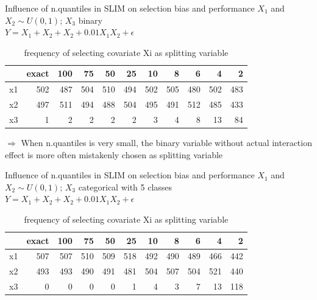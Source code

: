 \documentclass[9pt, xcolor=table]{beamer}
\begin{document}
\begin{frame}{Influence of n.quantiles in SLIM on selection bias and performance}
$X_1$ and $X_2 \sim U(0,1)$; $X_3$ binary\\
$Y = X_1 + X_2 + X_2 + 0.01X_1X_2 + \epsilon$

\begin{table}

\caption{frequency of selecting covariate Xi as splitting variable}
\centering
\begin{tabular}[t]{l|r|r|r|r|r|r|r|r|r|r}
\hline
  & exact & 100 & 75 & 50 & 25 & 10 & 8 & 6 & 4 & 2\\
\hline
x1 & 502 & 487 & 504 & 510 & 494 & 502 & 505 & 480 & 502 & 483\\
\hline
x2 & 497 & 511 & 494 & 488 & 504 & 495 & 491 & 512 & 485 & 433\\
\hline
x3 & 1 & 2 & 2 & 2 & 2 & 3 & 4 & 8 & 13 & 84\\
\hline
\end{tabular}
\end{table}

$\Rightarrow$ When n.quantiles is very small, the binary variable without actual interaction effect is more often mistakenly chosen as splitting variable

\end{frame}

\begin{frame}{Influence of n.quantiles in SLIM on selection bias and performance}
$X_1$ and $X_2 \sim U(0,1)$; $X_3$ categorical with 5 classes\\
$Y = X_1 + X_2 + X_2 + 0.01X_1X_2 + \epsilon$

\begin{table}

\caption{frequency of selecting covariate Xi as splitting variable}
\centering
\begin{tabular}[t]{l|r|r|r|r|r|r|r|r|r|r}
\hline
  & exact & 100 & 75 & 50 & 25 & 10 & 8 & 6 & 4 & 2\\
\hline
x1 & 507 & 507 & 510 & 509 & 518 & 492 & 490 & 489 & 466 & 442\\
\hline
x2 & 493 & 493 & 490 & 491 & 481 & 504 & 507 & 504 & 521 & 440\\
\hline
x3 & 0 & 0 & 0 & 0 & 1 & 4 & 3 & 7 & 13 & 118\\
\hline
\end{tabular}
\end{table}
\end{frame}
\end{document}
